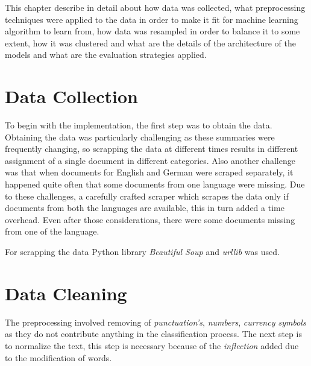
This chapter describe in detail about how data was collected, what preprocessing techniques were applied to the data in order to make it fit for machine learning algorithm to learn from, how data was resampled in order to balance it to some extent, how it was clustered and what are the details of the architecture of the models and what are the evaluation strategies applied.

\section{Data Collection}
To begin with the implementation, the first step was to obtain the data. Obtaining the data was particularly  challenging as these summaries were frequently changing, so scrapping the data at different times results in different assignment of a single document in different categories. Also another challenge was that when documents for English and German were scraped separately, it happened quite often that some documents from one language were missing. Due to these challenges, a carefully crafted scraper which scrapes the data only if documents from both the languages are available, this in turn added a time overhead. Even after those considerations, there were some documents missing from one of the language.

For scrapping the data Python library \textit{Beautiful Soup} and \textit{urllib} was used. 

\section{Data Cleaning}\label{preprocessing}

The preprocessing involved removing of \textit{punctuation's}, \textit{numbers}, \textit{currency symbols} as they do not contribute anything in the classification process. The next step is to normalize the text, this step is necessary because of the \textit{inflection} added due to the modification of words.

